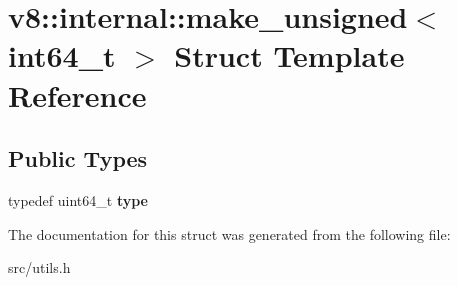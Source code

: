 \hypertarget{structv8_1_1internal_1_1make__unsigned_3_01int64__t_01_4}{}\section{v8\+:\+:internal\+:\+:make\+\_\+unsigned$<$ int64\+\_\+t $>$ Struct Template Reference}
\label{structv8_1_1internal_1_1make__unsigned_3_01int64__t_01_4}
\subsection*{Public Types}
\begin{DoxyCompactItemize}
\item 
\hypertarget{structv8_1_1internal_1_1make__unsigned_3_01int64__t_01_4_a8a940b55343f0566bfe7003868e11693}{}typedef uint64\+\_\+t {\bfseries type}\label{structv8_1_1internal_1_1make__unsigned_3_01int64__t_01_4_a8a940b55343f0566bfe7003868e11693}

\end{DoxyCompactItemize}


The documentation for this struct was generated from the following file\+:\begin{DoxyCompactItemize}
\item 
src/utils.\+h\end{DoxyCompactItemize}
